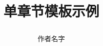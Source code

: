 \def\myTitle{\heiti 单章节模板示例}
\def\myAuthor{作者名字}
% 

\title{

    {\Huge{\textbf{\myTitle}}}}
\author{\myAuthor}
\date{}
\maketitle




